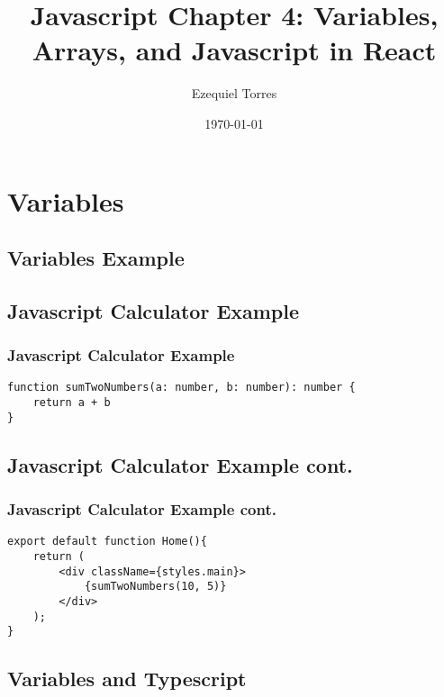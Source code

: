 \documentclass{beamer}
\begin{document}
\title{Javascript Chapter 4: Variables, Arrays, and Javascript in React}
\author{Ezequiel Torres}
\date{\today}
\frame{\titlepage}

\section{Variables}



\subsection{Variables Example}
\begin{frame}[fragile]
\subsection{Javascript Calculator Example}
\frametitle{Javascript Calculator Example}
\begin{lstlisting}
function sumTwoNumbers(a: number, b: number): number {
    return a + b
}
\end{lstlisting}
\end{frame}

\begin{frame}[fragile]
\subsection{Javascript Calculator Example cont.}
\frametitle{Javascript Calculator Example cont.}
\begin{lstlisting}
export default function Home(){
    return (
        <div className={styles.main}>
            {sumTwoNumbers(10, 5)}
        </div>
    );
}
\end{lstlisting}
\end{frame}

\subsection{Variables and Typescript}
\end{document}

